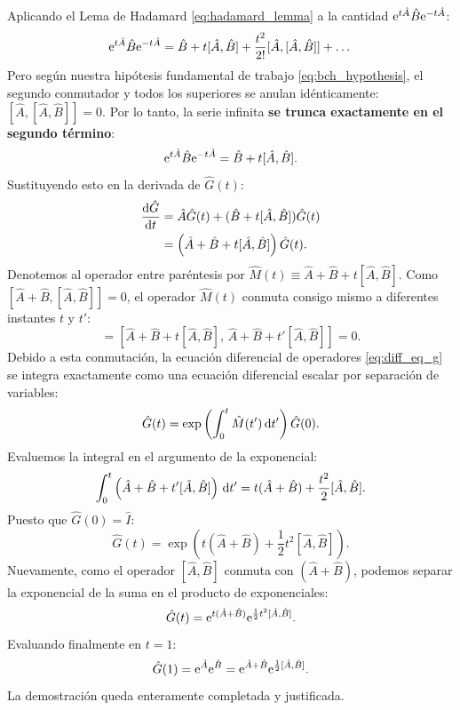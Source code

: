 Aplicando el Lema de Hadamard \eqref{eq:hadamard_lemma} a la cantidad $\mathrm{e}^{t\hat{A}}\hat{B}\mathrm{e}^{-t\hat{A}}$:
\begin{equation}
    \mathrm{e}^{t\hat{A}}\hat{B}\mathrm{e}^{-t\hat{A}} = \hat{B} + t[\hat{A}, \hat{B}] + \frac{t^2}{2!}[\hat{A}, [\hat{A}, \hat{B}]] + \dots
\end{equation}
Pero según nuestra hipótesis fundamental de trabajo \eqref{eq:bch_hypothesis}, el segundo conmutador y todos los superiores se anulan idénticamente: $[\hat{A}, [\hat{A}, \hat{B}]] = 0$. Por lo tanto, la serie infinita \textbf{se trunca exactamente en el segundo término}:
\begin{equation}
    \mathrm{e}^{t\hat{A}}\hat{B}\mathrm{e}^{-t\hat{A}} = \hat{B} + t[\hat{A}, \hat{B}].
\end{equation}
Sustituyendo esto en la derivada de $\hat{G}(t)$:
\begin{align}
    \frac{\mathrm{d}\hat{G}}{\mathrm{d} t} &= \hat{A}\hat{G}(t) + (\hat{B} + t[\hat{A}, \hat{B}])\hat{G}(t) \nonumber\\
    &= \left( \hat{A} + \hat{B} + t[\hat{A}, \hat{B}] \right)\hat{G}(t).
    \label{eq:diff_eq_g}
\end{align}
Denotemos al operador entre paréntesis por $\hat{M}(t) \equiv \hat{A} + \hat{B} + t[\hat{A}, \hat{B}]$. Como $[\hat{A}+\hat{B}, [\hat{A}, \hat{B}]] = 0$, el operador $\hat{M}(t)$ conmuta consigo mismo a diferentes instantes $t$ y $t'$:
\begin{equation}
    [\hat{M}(t), \hat{M}(t')] = [\hat{A}+\hat{B} + t[\hat{A},\hat{B}], \, \hat{A}+\hat{B} + t'[\hat{A},\hat{B}]] = 0.
\end{equation}
Debido a esta conmutación, la ecuación diferencial de operadores \eqref{eq:diff_eq_g} se integra exactamente como una ecuación diferencial escalar por separación de variables:
\begin{equation}
    \hat{G}(t) = \exp\left( \int_0^t \hat{M}(t')\,\mathrm{d} t' \right)\hat{G}(0).
\end{equation}
Evaluemos la integral en el argumento de la exponencial:
\begin{equation}
    \int_0^t \left( \hat{A} + \hat{B} + t'[\hat{A}, \hat{B}] \right)\,\mathrm{d} t' = t(\hat{A} + \hat{B}) + \frac{t^2}{2}[\hat{A}, \hat{B}].
\end{equation}
Puesto que $\hat{G}(0) = \hat{I}$:
\begin{equation}
    \hat{G}(t) = \exp\left( t(\hat{A} + \hat{B}) + \frac{1}{2}t^2[\hat{A}, \hat{B}] \right).
\end{equation}
Nuevamente, como el operador $[\hat{A}, \hat{B}]$ conmuta con $(\hat{A}+\hat{B})$, podemos separar la exponencial de la suma en el producto de exponenciales:
\begin{equation}
    \hat{G}(t) = \mathrm{e}^{t(\hat{A}+\hat{B})}\mathrm{e}^{\frac{1}{2}t^2[\hat{A}, \hat{B}]}.
\end{equation}
Evaluando finalmente en $t = 1$:
\begin{equation}
    \hat{G}(1) = \mathrm{e}^{\hat{A}}\mathrm{e}^{\hat{B}} = \mathrm{e}^{\hat{A}+\hat{B}}\mathrm{e}^{\frac{1}{2}[\hat{A}, \hat{B}]}.
\end{equation}
La demostración queda enteramente completada y justificada.

